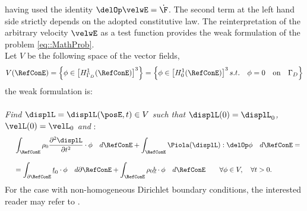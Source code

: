 having used the identity $\delOp\velwE = \dot{\F}$. The second term at the left hand side strictly depends on the adopted constitutive law. The reinterpretation of the arbitrary velocity $\velwE$ as a test function provides the weak formulation of the problem \eqref{eq::MathProb}.\\
Let $V$ be the following space of the vector fields,
\begin{equation}
  V(\RefConE)=\left\{\phi\in\left[H_{\Gamma_D}^1(\RefConE)\right]^3\right\}=\left\{\phi\in\left[H_{0}^1(\RefConE)\right]^3 s.t. \quad \phi=0 \quad\text{on}\quad\Gamma_D\right\}
  \label{eq::TestSpace}
\end{equation}
the weak formulation is:\\
 \\
\textit{Find $\displL=\displL(\posE,t)\in V$ such that $\displL(0)=\displL_0$, $\velL(0)=\velL_0$ and} :
\begin{equation}
  \begin{array}{lll}
    & \displaystyle \int_{\RefConE}\rho_0\frac{\partial^2 \displL}{\partial t^2}\cdot\phi\quad d\RefConE  + \int_{\RefConE}\Piola(\displL):\delOp\phi\quad d\RefConE = \\
    \\
    & \displaystyle = \int_{\partial \RefConE}\underline{t}_0\cdot\phi\quad d\partial\RefConE + \int_{\RefConE}\rho_0 \underline{b}\cdot\phi\quad d\RefConE \qquad \forall \phi\in V, \quad \forall t>0.
    \end{array}
  \label{eq::WF}
\end{equation}
For the case with non-homogeneous Dirichlet boundary conditions, the interested reader may refer to \cite{Hughes}.

